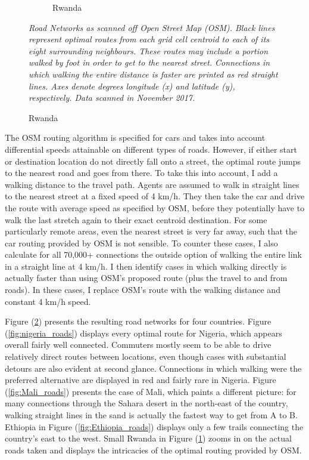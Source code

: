 \documentclass[11pt, oneside]{article}   	%
\let\oldref\ref
\renewcommand{\ref}[1]{(\oldref{#1})}
\newcommand{\mysubcaption}[1]{
\justify
\begin{spacing}{0.7}
\textit{\footnotesize #1}
\end{spacing}}
\begin{document}
\begin{figure}[t]
\begin{subfigure}[c]{0.43\textwidth}
\caption{Rwanda}
\label{fig:Rwanda_roads}
\end{subfigure}
\mysubcaption{Road Networks as scanned off Open Street Map (OSM). Black lines represent optimal routes from each grid cell centroid to each of its eight surrounding neighbours. These routes may include a portion walked by foot in order to get to the nearest street. Connections in which walking the entire distance is faster are printed as red straight lines. Axes denote degrees longitude (x) and latitude (y), respectively. Data scanned in November 2017.}

\label{fig:roads}
\end{figure}

The OSM routing algorithm is specified for cars and takes into account differential speeds attainable on different types of roads. However, if either start or destination location do not directly fall onto a street, the optimal route jumps to the nearest road and goes from there. To take this into account, I add a walking distance to the travel path. Agents are assumed to walk in straight lines to the nearest street at a fixed speed of 4 km/h. They then take the car and drive the route with average speed as specified by OSM, before they potentially have to walk the last stretch again to their exact centroid destination. For some particularly remote areas, even the nearest street is very far away, such that the car routing provided by OSM is not sensible. To counter these cases, I also calculate for all 70,000+ connections the outside option of walking the entire link in a straight line at 4 km/h. I then identify cases in which walking directly is actually faster than using OSM's proposed route (plus the travel to and from roads). In these cases, I replace OSM's route with the walking distance and constant 4 km/h speed.

Figure \ref{fig:roads} presents the resulting road networks for four countries. Figure \ref{fig:nigeria_roads} displays every optimal route for Nigeria, which appears overall fairly well connected. Commuters mostly seem to be able to drive relatively direct routes between locations, even though cases with substantial detours are also evident at second glance. Connections in which walking were the preferred alternative are displayed in red and fairly rare in Nigeria. Figure \ref{fig:Mali_roads} presents the case of Mali, which paints a different picture: for many connections through the Sahara desert in the north-east of the country, walking straight lines in the sand is actually the fastest way to get from A to B. Ethiopia in Figure \ref{fig:Ethiopia_roads} displays only a few trails connecting the country's east to the west. Small Rwanda in Figure \ref{fig:Rwanda_roads} zooms in on the actual roads taken and displays the intricacies of the optimal routing provided by OSM.
\end{document}
